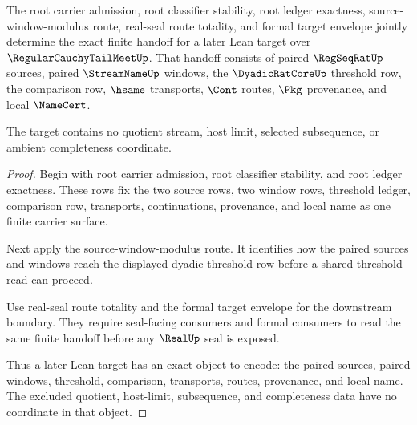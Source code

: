 \begin{theorem}
\label{thm:regular-cauchy-tail-meet-formal-handoff-lean-target}
The root carrier admission, root classifier stability, root ledger exactness, source-window-modulus route, real-seal route totality, and formal target envelope jointly determine the exact finite handoff for a later Lean target over $\RegularCauchyTailMeetUp$. That handoff consists of paired $\RegSeqRatUp$ sources, paired $\StreamNameUp$ windows, the $\DyadicRatCoreUp$ threshold row, the comparison row, $\hsame$ transports, $\Cont$ routes, $\Pkg$ provenance, and local $\NameCert$.

The target contains no quotient stream, host limit, selected subsequence, or ambient completeness coordinate.
\end{theorem}
\begin{proof}
Begin with root carrier admission, root classifier stability, and root ledger exactness. These rows fix the two source rows, two window rows, threshold ledger, comparison row, transports, continuations, provenance, and local name as one finite carrier surface.

Next apply the source-window-modulus route. It identifies how the paired sources and windows reach the displayed dyadic threshold row before a shared-threshold read can proceed.

Use real-seal route totality and the formal target envelope for the downstream boundary. They require seal-facing consumers and formal consumers to read the same finite handoff before any $\RealUp$ seal is exposed.

Thus a later Lean target has an exact object to encode: the paired sources, paired windows, threshold, comparison, transports, routes, provenance, and local name. The excluded quotient, host-limit, subsequence, and completeness data have no coordinate in that object.
\end{proof}

